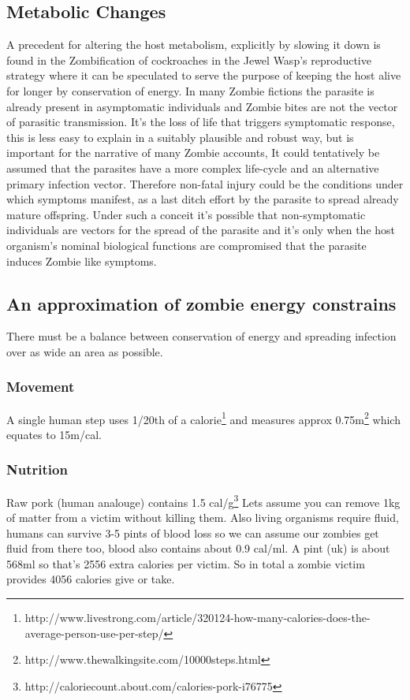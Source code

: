 \subsection{Metabolic Changes}
A precedent for altering the host metabolism, explicitly by slowing it down is found in the Zombification of cockroaches in the Jewel Wasp's reproductive strategy where it can be speculated to serve the purpose of keeping the host alive for longer by conservation of energy.
In many Zombie fictions the parasite is already present in asymptomatic individuals and Zombie bites are not the vector of parasitic transmission. It's the loss of life that triggers symptomatic response, this is less easy to explain in a suitably plausible and robust way, but is important for the narrative of many Zombie accounts, It could tentatively be assumed that the parasites have a more complex life-cycle and an alternative primary infection vector. Therefore non-fatal injury could be the conditions under which symptoms manifest, as a last ditch effort by the parasite to spread already mature offspring.
Under such a conceit it's possible that non-symptomatic individuals are vectors for the spread of the parasite and it's only when the host organism's nominal biological functions are compromised that the parasite induces Zombie like symptoms.

\subsection{An approximation of zombie energy constrains}
There must be a balance between conservation of energy and spreading infection over as wide an area as possible.

\subsubsection{Movement}
A single human step uses 1/20th of a calorie\footnote{http://www.livestrong.com/article/320124-how-many-calories-does-the-average-person-use-per-step/} and measures approx 0.75m\footnote{http://www.thewalkingsite.com/10000steps.html} 
which equates to 15m/cal.

\subsubsection{Nutrition}
Raw pork (human analouge) contains 1.5 cal/g\footnote{http://caloriecount.about.com/calories-pork-i76775}
Lets assume you can remove 1kg of matter from a victim without killing them.
Also living organisms require fluid, humans can survive 3-5 pints of blood loss so we can assume our zombies get fluid from there too, blood also contains about 0.9 cal/ml.
A pint (uk) is about 568ml so that's 2556 extra calories per victim.
So in total a zombie victim provides 4056 calories give or take.

